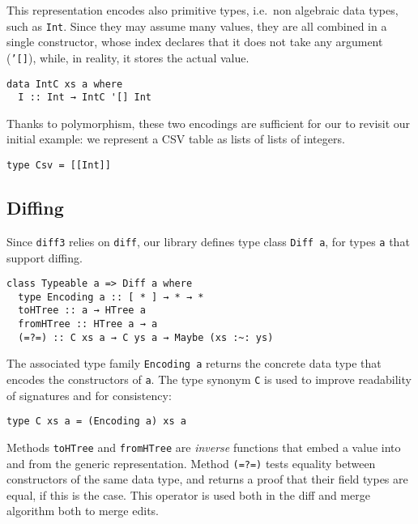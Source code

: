 \documentclass{sigplanconf}
\theoremstyle{plain}
\begin{document}
%
This representation encodes also primitive types, i.e.\ non algebraic
data types, such as \texttt{Int}.
%
Since they may assume many values, they are all combined in a single
constructor, whose index declares that it does not take any argument
(\texttt{'[]}), while, in reality, it stores the actual value.
\begin{verbatim}
data IntC xs a where
  I :: Int → IntC '[] Int
\end{verbatim}
Thanks to polymorphism, these two encodings are sufficient for our to
revisit our initial example: we represent a CSV table as lists of
lists of integers.
\begin{verbatim}
type Csv = [[Int]]
\end{verbatim} 

\subsection{Diffing}
Since \texttt{diff3} relies on \texttt{diff}, our library defines type
class \texttt{Diff a}, for types \texttt{a} that support diffing.

\begin{verbatim}
class Typeable a => Diff a where
  type Encoding a :: [ * ] → * → *
  toHTree :: a → HTree a
  fromHTree :: HTree a → a
  (=?=) :: C xs a → C ys a → Maybe (xs :~: ys)
\end{verbatim}
The associated type family \texttt{Encoding a} returns the concrete
data type that encodes the constructors of \texttt{a}.
%
The type synonym \texttt{C} is used to improve readability of signatures
and for consistency:
\begin{verbatim}
type C xs a = (Encoding a) xs a
\end{verbatim}
%
Methods \texttt{toHTree} and \texttt{fromHTree} are \emph{inverse}
functions that embed a value into and from the generic representation.
% 
%
%
%
%
Method \texttt{(=?=)} tests equality between constructors of the same
data type, and returns a proof that their field types are equal, if
this is the case. This operator is used both in the diff and merge
algorithm both to merge edits.
%
\end{document}
